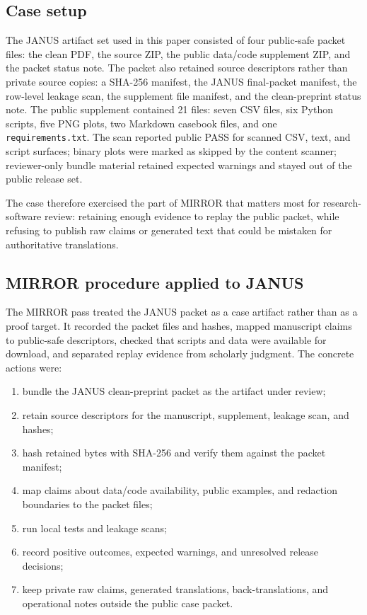 \documentclass[10pt]{article}
\newcommand{\mirror}{MIRROR}
\begin{document}
\subsection{Case setup}

The JANUS artifact set used in this paper consisted of four public-safe packet files: the clean PDF, the source ZIP, the public data/code supplement ZIP, and the packet status note. The packet also retained source descriptors rather than private source copies: a SHA-256 manifest, the JANUS final-packet manifest, the row-level leakage scan, the supplement file manifest, and the clean-preprint status note. The public supplement contained 21 files: seven CSV files, six Python scripts, five PNG plots, two Markdown casebook files, and one \texttt{requirements.txt}. The scan reported public PASS for scanned CSV, text, and script surfaces; binary plots were marked as skipped by the content scanner; reviewer-only bundle material retained expected warnings and stayed out of the public release set.

The case therefore exercised the part of \mirror{} that matters most for research-software review: retaining enough evidence to replay the public packet, while refusing to publish raw claims or generated text that could be mistaken for authoritative translations.

\subsection{MIRROR procedure applied to JANUS}

The \mirror{} pass treated the JANUS packet as a case artifact rather than as a proof target. It recorded the packet files and hashes, mapped manuscript claims to public-safe descriptors, checked that scripts and data were available for download, and separated replay evidence from scholarly judgment. The concrete actions were:

\begin{enumerate}
\item bundle the JANUS clean-preprint packet as the artifact under review;
\item retain source descriptors for the manuscript, supplement, leakage scan, and hashes;
\item hash retained bytes with SHA-256 and verify them against the packet manifest;
\item map claims about data/code availability, public examples, and redaction boundaries to the packet files;
\item run local tests and leakage scans;
\item record positive outcomes, expected warnings, and unresolved release decisions;
\item keep private raw claims, generated translations, back-translations, and operational notes outside the public case packet.
\end{enumerate}
\end{document}
